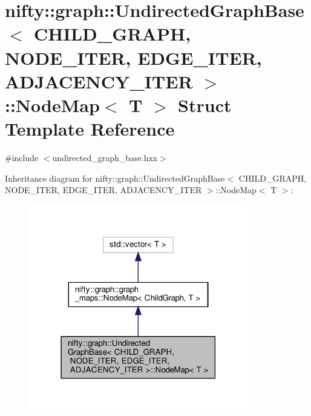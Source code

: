 \hypertarget{structnifty_1_1graph_1_1UndirectedGraphBase_1_1NodeMap}{}\section{nifty\+:\+:graph\+:\+:Undirected\+Graph\+Base$<$ C\+H\+I\+L\+D\+\_\+\+G\+R\+A\+PH, N\+O\+D\+E\+\_\+\+I\+T\+ER, E\+D\+G\+E\+\_\+\+I\+T\+ER, A\+D\+J\+A\+C\+E\+N\+C\+Y\+\_\+\+I\+T\+ER $>$\+:\+:Node\+Map$<$ T $>$ Struct Template Reference}
\label{structnifty_1_1graph_1_1UndirectedGraphBase_1_1NodeMap}


{\ttfamily \#include $<$undirected\+\_\+graph\+\_\+base.\+hxx$>$}



Inheritance diagram for nifty\+:\+:graph\+:\+:Undirected\+Graph\+Base$<$ C\+H\+I\+L\+D\+\_\+\+G\+R\+A\+PH, N\+O\+D\+E\+\_\+\+I\+T\+ER, E\+D\+G\+E\+\_\+\+I\+T\+ER, A\+D\+J\+A\+C\+E\+N\+C\+Y\+\_\+\+I\+T\+ER $>$\+:\+:Node\+Map$<$ T $>$\+:
\nopagebreak
\begin{figure}[H]
\begin{center}
\leavevmode
\includegraphics[width=271pt]{structnifty_1_1graph_1_1UndirectedGraphBase_1_1NodeMap__inherit__graph}
\end{center}
\end{figure}


